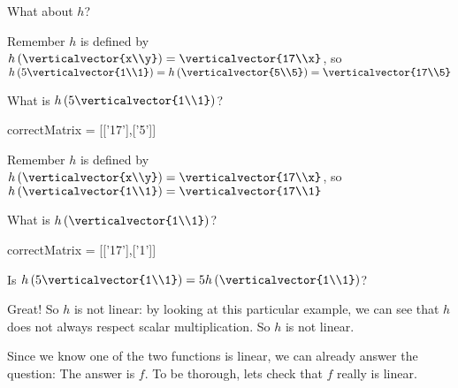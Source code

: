 \documentclass{ximera}
\begin{document}
\begin{question}
\begin{solution}
\begin{hint}
\begin{question}
        	What about $h$?
        	\begin{solution}
		\begin{hint}
			Remember $h$ is defined by $h\left( \verticalvector{x\\y}\right) =\verticalvector{17\\x}$, so
			$h\left(5 \verticalvector{1\\1}\right) = h\left(\verticalvector{5\\5}\right) = \verticalvector{17\\5}$
		\end{hint}
        	 What is $h\left(5 \verticalvector{1\\1}\right)$?
        	\begin{matrix-answer}[name=v]
    			  correctMatrix = [['17'],['5']]
        	 \end{matrix-answer}
        	\end{solution}
        	\begin{solution}
		\begin{hint}
			Remember $h$ is defined by $h\left( \verticalvector{x\\y}\right) =\verticalvector{17\\x}$, so
			$h\left(\verticalvector{1\\1}\right) =  \verticalvector{17\\1}$
		\end{hint}
        	 What is $h\left(\verticalvector{1\\1}\right)$?
        	 \begin{matrix-answer}[name=v]
    			  correctMatrix = [['17'],['1']]
        	 \end{matrix-answer}
        	\end{solution}
        	\begin{solution}
        		Is $h\left(5 \verticalvector{1\\1}\right) = 5 h\left(\verticalvector{1\\1}\right)$?
        		\begin{multiple-choice}
        		\choice{Yes}
        		\choice[correct]{No}
        		\end{multiple-choice}
        	\end{solution}
        	Great!  So $h$ is not linear:  by looking at this particular example, we can see that $h$ does not always respect scalar multiplication.  So $h$ is not linear.
		
        	Since we know one of the two functions is linear, we can already answer the question:  The answer is $f$.  To be thorough, lets check that $f$ really is linear.
		

\end{question}
\end{hint}
\end{solution}
\end{question}
\end{document}
